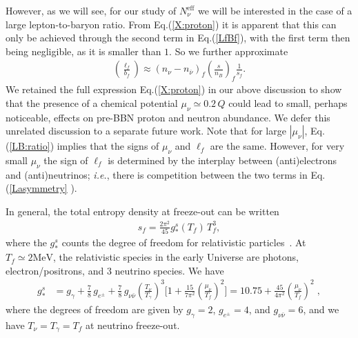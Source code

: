 However, as we will see, for our study of $N_\nu^{\mathrm{eff}}$ we will be interested in the case of a large lepton-to-baryon ratio. From Eq.\;(\ref{X:proton}) it is apparent that this can only be achieved through the second term in Eq.\;(\ref{LfBf}), with the first term then being negligible, as it is smaller than $1$. So we further approximate
\begin{align}\label{LB:ratio}
\left(\frac{\ell_f}{b_f}\right)  
\approx\left(n_{\nu}-n_{\overline{\nu}}\right)_f \left(\frac{s}{n_B}\right)_f \frac{1}{s_f}.
\end{align}
We retained the full expression Eq.\;(\ref{X:proton}) in our above discussion to show that the presence of a chemical potential $\mu_\nu\simeq 0.2\,Q$ could lead to small, perhaps noticeable, effects on pre-BBN proton and neutron abundance. We defer this unrelated discussion to a separate future work. Note that for large $|\mu_\nu|$, Eq.\;(\ref{LB:ratio}) implies that the signs of $\mu_\nu$ and $\ell_f$ are the same. However, for very small $\mu_\nu$ the sign of $\ell_f$ is determined by the interplay between (anti)electrons and (anti)neutrinos; {\it i.e.\/}, there is competition between the two terms in Eq.\;(\ref{Lasymmetry} ).

In general, the total entropy density at freeze-out can be written
\begin{align}
\label{eq:EntropyDensity}
s_f=\frac{2\pi^2}{45}g^s_\ast(T_f)\,T_f^3,
\end{align}
where the $g^s_\ast$ counts the degree of freedom for relativistic particles~\cite{Kolb:1990vq}. At $T_f\simeq 2\mathrm{MeV}$, the relativistic species in the early Universe are photons, electron/positrons, and $3$ neutrino species. We have
\begin{align}
g^s_{\ast}&= g_\gamma+\frac{7}{8}\,g_{e^\pm}+\frac{7}{8}\,g_{\nu\bar{\nu}}\left(\frac{T_\nu}{T_\gamma}\right)^{\!\!3}\bigg[1+\frac{15}{7\pi^2}\left(\frac{\mu_\nu}{T_f}\right)^{\!\!2}\bigg]=10.75+\frac{45}{4\pi^2}\left(\frac{\mu_\nu}{T_f}\right)^{\!\!2}\;,
\end{align}
where the degrees of freedom are given by $g_\gamma=2$, $g_{e^\pm}=4$, and $g_{\nu\bar{\nu}}=6$, and we have $T_\nu=T_\gamma=T_f$ at neutrino freeze-out.


